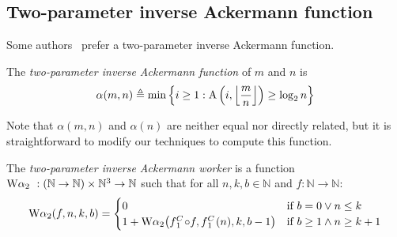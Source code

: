 \newcommand{\Texp}{\runtime_{\li{exp}}}
\newcommand{\Tmul}{\runtime_{\li{mul}}}
\newcommand{\Tleb}{\runtime_{\li{leb}}}
\newcommand{\Tsucc}{\runtime_{\li{succ}}}
\subsection{Two-parameter inverse Ackermann function}
Some authors~\cite{tarjan,chazelle} prefer a two-parameter inverse Ackermann function.
\begin{defn} \label{defn: 2para-alpha}
	The \emph{two-parameter inverse Ackermann function} of $m$ and $n$ is
	\begin{equation} \label{eq: tmp-2para-alpha}
	\alpha(m, n) \triangleq \min\left\{i \ge 1 : \text{A}\left(i, \left\lfloor \frac{m}{n} \right\rfloor \right)\ge \log_2n \right\}
	\end{equation}
\end{defn}
Note that $\alpha(m, n)$ and $\alpha(n)$ are neither equal nor directly related, but
it is straightforward to modify our techniques to compute this function.
\begin{defn} \label{defn: 2para-inv-ack-worker}
	The \emph{two-parameter inverse Ackermann worker}  is a function $\text{W}\alpha_2\ : (\mathbb{N}\to \mathbb{N}) \times \mathbb{N}^3\to \mathbb{N}$ such that for all $n, k, b\in \mathbb{N}$ and $f:\mathbb{N}\to \mathbb{N}$:
	\begin{equation} \label{eq: 2para-inv-ack-worker-recursion}
	\W\alpha_2(f, n, k, b) = \begin{cases}
	0 & \text{if } b = 0 \vee n\le k \\ 1 + \W\alpha_2\big(\cdt{f}{1}\circ f , \cdt{f}{1}(n), k, b-1\big) & \text{if } b \ge 1 \wedge n \ge k+1
	\end{cases}
	\end{equation}
\end{defn}
